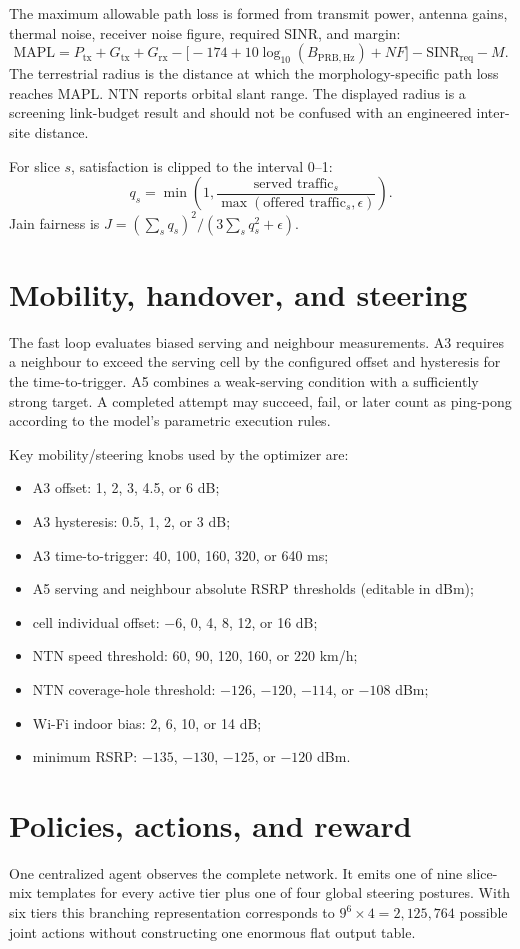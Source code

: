 \documentclass[10pt]{article}
\begin{document}
The maximum allowable path loss is formed from transmit power, antenna gains, thermal noise, receiver noise figure, required SINR, and margin:
\[
\mathrm{MAPL}=P_{\mathrm{tx}}+G_{\mathrm{tx}}+G_{\mathrm{rx}}
-\bigl[-174+10\log_{10}(B_{\mathrm{PRB,Hz}})+NF\bigr]
-\mathrm{SINR}_{\mathrm{req}}-M.
\]
The terrestrial radius is the distance at which the morphology-specific path loss reaches MAPL. NTN reports orbital slant range. The displayed radius is a screening link-budget result and should not be confused with an engineered inter-site distance.

For slice $s$, satisfaction is clipped to the interval 0--1:
\[
q_s=\min\!\left(1,\frac{\text{served traffic}_s}{\max(\text{offered traffic}_s,\epsilon)}\right).
\]
Jain fairness is $J=(\sum_s q_s)^2/(3\sum_s q_s^2+\epsilon)$.

\section{Mobility, handover, and steering}
The fast loop evaluates biased serving and neighbour measurements. A3 requires a neighbour to exceed the serving cell by the configured offset and hysteresis for the time-to-trigger. A5 combines a weak-serving condition with a sufficiently strong target. A completed attempt may succeed, fail, or later count as ping-pong according to the model's parametric execution rules.

Key mobility/steering knobs used by the optimizer are:
\begin{itemize}
  \item A3 offset: 1, 2, 3, 4.5, or 6 dB;
  \item A3 hysteresis: 0.5, 1, 2, or 3 dB;
  \item A3 time-to-trigger: 40, 100, 160, 320, or 640 ms;
  \item A5 serving and neighbour absolute RSRP thresholds (editable in dBm);
  \item cell individual offset: $-6$, 0, 4, 8, 12, or 16 dB;
  \item NTN speed threshold: 60, 90, 120, 160, or 220 km/h;
  \item NTN coverage-hole threshold: $-126$, $-120$, $-114$, or $-108$ dBm;
  \item Wi-Fi indoor bias: 2, 6, 10, or 14 dB;
  \item minimum RSRP: $-135$, $-130$, $-125$, or $-120$ dBm.
\end{itemize}

\section{Policies, actions, and reward}
One centralized agent observes the complete network. It emits one of nine slice-mix templates for every active tier plus one of four global steering postures. With six tiers this branching representation corresponds to $9^6\times4=2{,}125{,}764$ possible joint actions without constructing one enormous flat output table.
\end{document}
